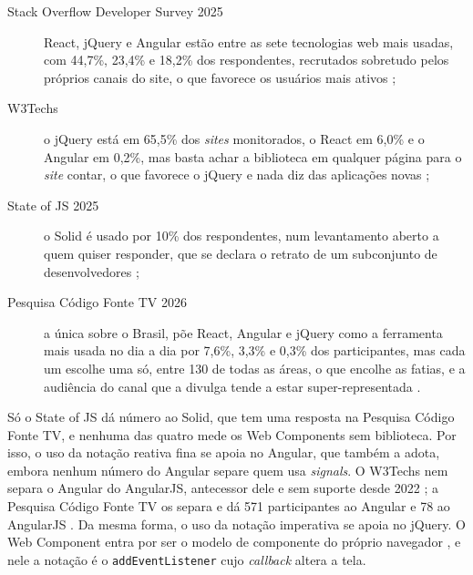 \begin{description}
\item[{Stack Overflow Developer Survey 2025}] React, jQuery e Angular estão
entre as sete tecnologias web mais usadas, com 44,7\%, 23,4\% e 18,2\% dos
respondentes, recrutados sobretudo pelos próprios canais do site, o que
favorece os usuários mais ativos \cite{stackoverflow2025};
\item[{W3Techs}] o jQuery está em 65,5\% dos \emph{sites} monitorados, o React em
6,0\% e o Angular em 0,2\%, mas basta achar a biblioteca em qualquer
página para o \emph{site} contar, o que favorece o jQuery e nada diz das
aplicações novas \cite{w3techs2026,w3techs2026a};
\item[{State of JS 2025}] o Solid é usado por 10\% dos respondentes, num
levantamento aberto a quem quiser responder, que se declara o retrato
de um subconjunto de desenvolvedores \cite{devographics2026};
\item[{Pesquisa Código Fonte TV 2026}] a única sobre o Brasil, põe React,
Angular e jQuery como a ferramenta mais usada no dia a dia por 7,6\%,
3,3\% e 0,3\% dos participantes, mas cada um escolhe uma só, entre 130
de todas as áreas, o que encolhe as fatias, e a audiência do canal que
a divulga tende a estar super-representada \cite{codigofonte2026}.
\end{description}

Só o State of JS dá número ao Solid, que tem uma resposta na Pesquisa
Código Fonte TV, e nenhuma das quatro mede os Web Components sem
biblioteca.
Por isso, o uso da notação reativa fina se apoia no Angular, que também a
adota, embora nenhum número do Angular separe quem usa \emph{signals}.
O W3Techs nem separa o Angular do AngularJS, antecessor dele e sem
suporte desde 2022 \cite{thompson2022}; a Pesquisa Código Fonte TV os
separa e dá 571 participantes ao Angular e 78 ao AngularJS
\cite{codigofonte2026}.
Da mesma forma, o uso da notação imperativa se apoia no jQuery.
O Web Component entra por ser o modelo de componente do próprio navegador
\cite{mozilla2026}, e nele a notação é o \texttt{addEventListener} cujo \emph{callback}
altera a tela.

